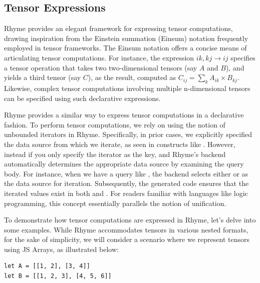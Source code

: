 \documentclass[runningheads]{llncs}
\newcommand{\lang}{Rhyme}
\begin{document}

\subsection{Tensor Expressions}\label{subsec:tensor}

\lang{} provides an elegant framework for expressing tensor computations,
drawing inspiration from the Einstein summation (Einsum) notation frequently
employed in tensor frameworks.
The Einsum notation offers a concise means of articulating tensor computations.
For instance, the expression $ik,kj \rightarrow ij$ specifies a tensor operation
that takes two two-dimensional tensors (say $A$ and $B$), and yields a third
tensor (say $C$), as the result, computed as $C_{ij} = \sum_k A_{ik} \times B_{kj}$.
Likewise, complex tensor computations involving multiple n-dimensional tensors can
be specified using such declarative expressions.

\lang{} provides a similar way to express tensor computations in a declarative fashion.
To perform tensor computations, we rely on using the notion of unbounded iterators in \lang{}.
Specifically, in prior cases, we explicitly specified the data source from which we iterate,
as seen in constructs like .
However, instead if you only specify the iterator as the key, and \lang{}'s backend
automatically determines the appropriate data source by examining the query body.
For instance, when we have a query like , the
backend selects either  or  as the data source for iteration.
Subsequently, the generated code ensures that the iterated values exist in
both  and .
For readers familiar with languages like logic programming, this concept essentially
parallels the notion of unification.

To demonstrate how tensor computations are expressed in \lang{}, let's delve into
some examples.
While \lang{} accommodates tensors in various nested formats, for the sake of simplicity,
we will consider a scenario where we represent tensors using JS Arrays, as illustrated below:
\begin{lstlisting}[style=JavaScript,columns=flexible]
let A = [[1, 2], [3, 4]]
let B = [[1, 2, 3], [4, 5, 6]]
\end{lstlisting}
\end{document}
